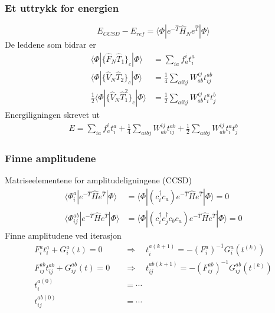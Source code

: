 \documentclass[norsk,a4paper,12pt]{beamer}
\begin{document}
  \begin{frame}
    \frametitle{Et uttrykk for energien}
    \begin{equation}
    E_{CCSD}-E_{ref}=\langle\Phi|e^{-\hat{T}}\hat{H}_Ne^{\hat{T}}|\Phi\rangle
    \end{equation}
    De leddene som bidrar er
    \begin{align*}
    \langle\Phi|\{\hat{F}_N\hat{T}_1\}_c|\Phi\rangle&=\sum_{ia}f_a^it_i^a\\
    \langle\Phi|\{\hat{V}_N\hat{T}_2\}_c|\Phi\rangle&=\frac{1}{4}\sum_{aibj}W_{ab}^{ij}t_{ij}^{ab}\\
    \frac{1}{2}\langle\Phi|\{\hat{V}_N\hat{T}_1^2\}_c|\Phi\rangle&=\frac{1}{2}\sum_{aibj}W_{ab}^{ij}t_i^at_j^b
    \end{align*}
    Energiligningen skrevet ut
    \begin{align}
    E=\sum_{ia}f_a^it_i^a+\frac{1}{4}\sum_{aibj}W_{ab}^{ij}t_{ij}^{ab}+\frac{1}{2}\sum_{aibj}W_{ab}^{ij}t_i^at_j^b
    \end{align}
  \end{frame}
  
  \begin{frame}
    \frametitle{Finne amplitudene}
    Matriseelementene for amplitudeligningene (CCSD)
    \begin{align}
    \langle\Phi_{i}^a|e^{-\hat{T}}\hat{H}e^{\hat{T}}|\Phi\rangle&=\langle\Phi|(c_i^{\dagger}c_a)e^{-\hat{T}}\hat{H}e^{\hat{T}}|\Phi\rangle=0\\
    \langle\Phi_{ij}^{ab}|e^{-\hat{T}}\hat{H}e^{\hat{T}}|\Phi\rangle&=\langle\Phi|(c_i^{\dagger}c_j^{\dagger}c_bc_a)e^{-\hat{T}}\hat{H}e^{\hat{T}}|\Phi\rangle=0
    \end{align}
    Finne amplitudene ved iterasjon
    \begin{align*}
    F_i^at_i^a+G_i^a(t)=0\quad&\Rightarrow\quad t_i^{a(k+1)}=-(F_i^a)^{-1}G_i^a(t^{(k)})\\
    F_{ij}^{ab}t_{ij}^{ab}+G_{ij}^{ab}(t)=0\quad&\Rightarrow\quad t_{ij}^{ab(k+1)}=-(F_{ij}^{ab})^{-1}G_{ij}^{ab}(t^{(k)})\\
    t_i^{a(0)}&=\cdots\\
    t_{ij}^{ab(0)}&=\cdots
    \end{align*}
  \end{frame}
\end{document}
